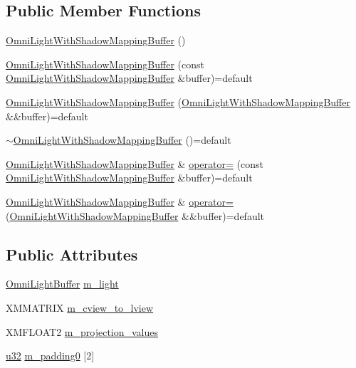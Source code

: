 \subsection*{Public Member Functions}
\begin{DoxyCompactItemize}
\item 
\hyperlink{structmage_1_1_omni_light_with_shadow_mapping_buffer_a02ade96988185cc3b0f24f4618534935}{Omni\+Light\+With\+Shadow\+Mapping\+Buffer} ()
\item 
\hyperlink{structmage_1_1_omni_light_with_shadow_mapping_buffer_a6aabe633e5b81842a7686561c8af30fc}{Omni\+Light\+With\+Shadow\+Mapping\+Buffer} (const \hyperlink{structmage_1_1_omni_light_with_shadow_mapping_buffer}{Omni\+Light\+With\+Shadow\+Mapping\+Buffer} \&buffer)=default
\item 
\hyperlink{structmage_1_1_omni_light_with_shadow_mapping_buffer_afb66f7933b73e60c234dc89e3033271a}{Omni\+Light\+With\+Shadow\+Mapping\+Buffer} (\hyperlink{structmage_1_1_omni_light_with_shadow_mapping_buffer}{Omni\+Light\+With\+Shadow\+Mapping\+Buffer} \&\&buffer)=default
\item 
\hyperlink{structmage_1_1_omni_light_with_shadow_mapping_buffer_ac28ea25ecb8f27be2403c37a16fd9631}{$\sim$\+Omni\+Light\+With\+Shadow\+Mapping\+Buffer} ()=default
\item 
\hyperlink{structmage_1_1_omni_light_with_shadow_mapping_buffer}{Omni\+Light\+With\+Shadow\+Mapping\+Buffer} \& \hyperlink{structmage_1_1_omni_light_with_shadow_mapping_buffer_ab94e93f02ca982d85be2bd8da2714c01}{operator=} (const \hyperlink{structmage_1_1_omni_light_with_shadow_mapping_buffer}{Omni\+Light\+With\+Shadow\+Mapping\+Buffer} \&buffer)=default
\item 
\hyperlink{structmage_1_1_omni_light_with_shadow_mapping_buffer}{Omni\+Light\+With\+Shadow\+Mapping\+Buffer} \& \hyperlink{structmage_1_1_omni_light_with_shadow_mapping_buffer_ad7801e067fde2f54f0c328b2e34ed118}{operator=} (\hyperlink{structmage_1_1_omni_light_with_shadow_mapping_buffer}{Omni\+Light\+With\+Shadow\+Mapping\+Buffer} \&\&buffer)=default
\end{DoxyCompactItemize}
\subsection*{Public Attributes}
\begin{DoxyCompactItemize}
\item 
\hyperlink{structmage_1_1_omni_light_buffer}{Omni\+Light\+Buffer} \hyperlink{structmage_1_1_omni_light_with_shadow_mapping_buffer_ad04cdb09bc31de362f8f4f75aa5b6aea}{m\+\_\+light}
\item 
X\+M\+M\+A\+T\+R\+IX \hyperlink{structmage_1_1_omni_light_with_shadow_mapping_buffer_ac8818649198198519826adf18fe0da7d}{m\+\_\+cview\+\_\+to\+\_\+lview}
\item 
X\+M\+F\+L\+O\+A\+T2 \hyperlink{structmage_1_1_omni_light_with_shadow_mapping_buffer_afd75d76a4713da8430e0c0080602e0b7}{m\+\_\+projection\+\_\+values}
\item 
\hyperlink{namespacemage_af2b398bf98eb10351f49cad73fe2cc73}{u32} \hyperlink{structmage_1_1_omni_light_with_shadow_mapping_buffer_a789c3cbddfcad2f03e2378ced2db5012}{m\+\_\+padding0} \mbox{[}2\mbox{]}
\end{DoxyCompactItemize}
